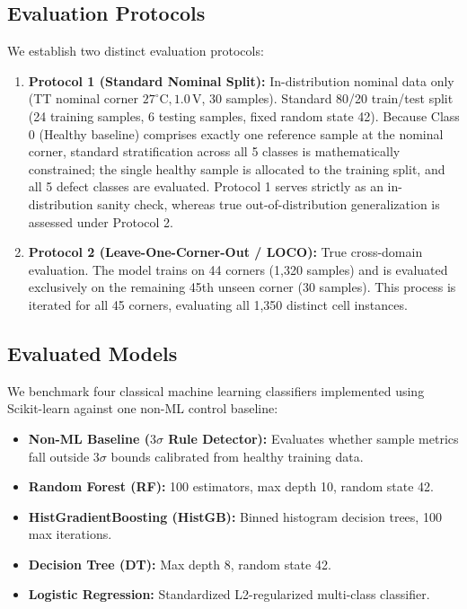\documentclass[conference]{IEEEtran}
\begin{document}
\subsection{Evaluation Protocols}
We establish two distinct evaluation protocols:
\begin{enumerate}
    \item \textbf{Protocol 1 (Standard Nominal Split):} In-distribution nominal data only (TT nominal corner $27^\circ\text{C}, 1.0\,\text{V}$, 30 samples). Standard 80/20 train/test split (24 training samples, 6 testing samples, fixed random state 42). Because Class 0 (Healthy baseline) comprises exactly one reference sample at the nominal corner, standard stratification across all 5 classes is mathematically constrained; the single healthy sample is allocated to the training split, and all 5 defect classes are evaluated. Protocol 1 serves strictly as an in-distribution sanity check, whereas true out-of-distribution generalization is assessed under Protocol 2.
    \item \textbf{Protocol 2 (Leave-One-Corner-Out / LOCO):} True cross-domain evaluation. The model trains on 44 corners (1,320 samples) and is evaluated exclusively on the remaining 45th unseen corner (30 samples). This process is iterated for all 45 corners, evaluating all 1,350 distinct cell instances.
\end{enumerate}

\subsection{Evaluated Models}
We benchmark four classical machine learning classifiers implemented using Scikit-learn \cite{pedregosa2011scikit} against one non-ML control baseline:
\begin{itemize}
    \item \textbf{Non-ML Baseline ($3\sigma$ Rule Detector):} Evaluates whether sample metrics fall outside $3\sigma$ bounds calibrated from healthy training data.
    \item \textbf{Random Forest (RF):} 100 estimators, max depth 10, random state 42.
    \item \textbf{HistGradientBoosting (HistGB):} Binned histogram decision trees, 100 max iterations.
    \item \textbf{Decision Tree (DT):} Max depth 8, random state 42.
    \item \textbf{Logistic Regression:} Standardized L2-regularized multi-class classifier.
\end{itemize}
\end{document}
